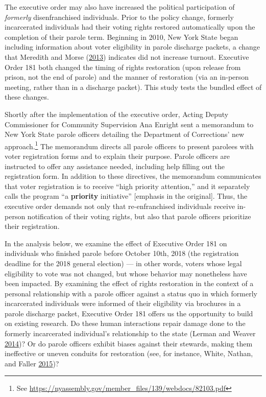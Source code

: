 \documentclass[
  12pt,
]{article}
\begin{document}
The executive order may also have increased the political participation of \emph{formerly} disenfranchised individuals. Prior to the policy change, formerly incarcerated individuals had their voting rights restored automatically upon the completion of their parole term. Beginning in 2010, New York State began including information about voter eligibility in parole discharge packets, a change that Meredith and Morse (\protect\hyperlink{ref-Meredith2013}{2013}) indicates did not increase turnout. Executive Order 181 both changed the timing of rights restoration (upon release from prison, not the end of parole) and the manner of restoration (via an in-person meeting, rather than in a discharge packet). This study tests the bundled effect of these changes.

Shortly after the implementation of the executive order, Acting Deputy Commissioner for Community Supervision Ana Enright sent a memorandum to New York State parole officers detailing the Department of Corrections' new approach.\footnote{See \url{https://nyassembly.gov/member_files/139/webdocs/82103.pdf}} The memorandum directs all parole officers to present parolees with voter registration forms and to explain their purpose. Parole officers are instructed to offer any assistance needed, including help filling out the registration form. In addition to these directives, the memorandum communicates that voter registration is to receive ``high priority attention,'' and it separately calls the program ``a \textbf{priority} initiative'' {[}emphasis in the original{]}. Thus, the executive order demands not only that re-enfranchised individuals receive in-person notification of their voting rights, but also that parole officers prioritize their registration.

In the analysis below, we examine the effect of Executive Order 181 on individuals who finished parole before October 10th, 2018 (the registration deadline for the 2018 general election) --- in other words, voters whose legal eligibility to vote was not changed, but whose behavior may nonetheless have been impacted. By examining the effect of rights restoration in the context of a personal relationship with a parole officer against a status quo in which formerly incarcerated individuals were informed of their eligibility via brochures in a parole discharge packet, Executive Order 181 offers us the opportunity to build on existing research. Do these human interactions repair damage done to the formerly incarcerated individual's relationship to the state (Lerman and Weaver \protect\hyperlink{ref-Lerman2014}{2014})? Or do parole officers exhibit biases against their stewards, making them ineffective or uneven conduits for restoration (see, for instance, White, Nathan, and Faller \protect\hyperlink{ref-White2015}{2015})?
\end{document}
